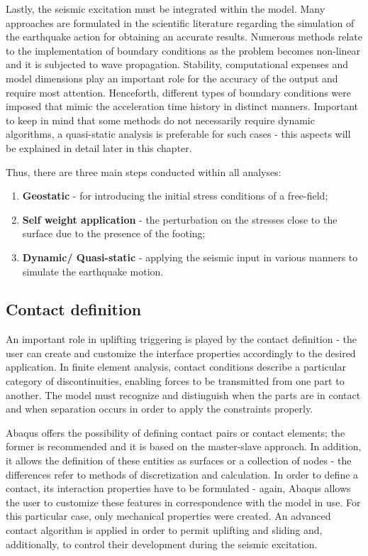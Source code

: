 Lastly, the seismic excitation must be integrated within the model. Many approaches are formulated in the scientific literature regarding the simulation of the earthquake action for obtaining an accurate results. Numerous methods relate to the implementation of boundary conditions as the problem becomes non-linear and it is subjected to wave propagation. Stability, computational expenses and model dimensions play an important role for the accuracy of the output and require most attention.  Henceforth, different types of boundary conditions were imposed that mimic the acceleration time history in distinct manners. Important to keep in mind that some methods do not necessarily require dynamic algorithms, a quasi-static analysis is preferable for such cases - this aspects will be explained in detail later in this chapter.

Thus, there are three main steps conducted within all analyses:
\begin{enumerate}
	\item \textbf{Geostatic} - for introducing the initial stress conditions of a free-field;
	\item \textbf{Self weight application} - the perturbation on the stresses close to the surface due to the presence of the footing;
	\item \textbf{Dynamic/ Quasi-static} - applying the seismic input in various manners to simulate the earthquake motion.
\end{enumerate}

\subsection{Contact definition}
An important role in uplifting triggering is played by the contact definition - the user can create and customize the interface properties accordingly to the desired application. In finite element analysis, contact conditions describe a particular category of discontinuities, enabling forces to be transmitted from one part to another. The model must recognize and distinguish when the parts are in contact and when separation occurs in order to apply the constraints properly. 

Abaqus offers the possibility of defining contact pairs or contact elements; the former is recommended and it is based on the master-slave approach. In addition, it allows the definition of these entities as surfaces or a collection of nodes - the differences refer to methods of discretization and calculation. In order to define a contact, its interaction properties have to be formulated - again, Abaqus allows the user to customize these features in correspondence with the model in use. For this particular case, only mechanical properties were created. An advanced contact algorithm is applied in order to permit uplifting and sliding and, additionally, to control their development during the seismic excitation. 

